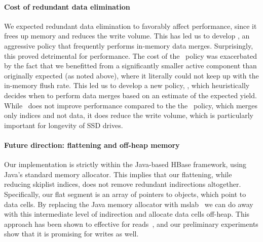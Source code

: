 \paragraph{Cost of redundant data elimination}
We expected redundant data elimination to favorably affect performance, since it frees up memory and reduces the write volume.
This has led us to develop \eager, an aggressive policy that frequently performs in-memory data merges. 
Surprisingly, this proved detrimental for performance. The cost of the \eager\ policy was exacerbated by the 
fact that we benefitted from a significantly smaller active component than originally expected (as noted above),  
where it literally could not keep up with the in-memory flush rate. 
This led us to develop a new policy, \adp, which heuristically decides when to perform data merges based on 
an estimate of the expected yield. 
While \adp\ does not improve performance compared to the the \basic\ policy, which merges only indices and not data,
it does reduce the write volume, which is particularly important for longevity of SSD drives.
 
\paragraph{Future direction: flattening and off-heap memory}
Our implementation is strictly within the Java-based HBase framework, using Java's standard memory allocator.
This implies that our flattening, while reducing skiplist indices, does not remove redundant indirections altogether.
Specifically, our flat segment is an array of pointers to objects, which point to data cells. 
By replacing the Java memory allocator  with mslab~\cite{mslab} we can do away with this intermediate level 
of indirection and allocate data cells off-heap. This approach has been shown to effective for reads~\cite{alibabahbase}, 
and our preliminary experiments show that it is promising  for writes as well.  

